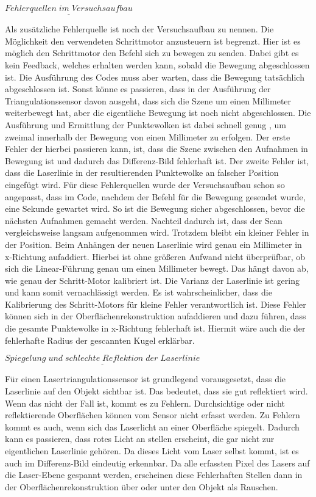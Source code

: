 		$\underline{Fehlerquellen \; im \; Versuchsaufbau}$
		
		Als zusätzliche Fehlerquelle ist noch der Versuchsaufbau zu nennen. Die Möglichkeit den verwendeten Schrittmotor anzusteuern ist begrenzt. Hier ist es möglich den Schrittmotor den Befehl sich zu bewegen zu senden. Dabei gibt es kein Feedback, welches erhalten werden kann, sobald die Bewegung abgeschlossen ist. Die Ausführung des Codes muss aber warten, dass die Bewegung tatsächlich abgeschlossen ist. Sonst könne es passieren, dass in der Ausführung der Triangulationssensor davon ausgeht, dass sich die Szene um einen Millimeter weiterbewegt hat, aber die eigentliche Bewegung ist noch nicht abgeschlossen. Die Ausführung und Ermittlung der Punktewolken ist dabei schnell genug , um zweimal innerhalb der Bewegung von einen Millimeter zu erfolgen. Der erste Fehler der hierbei passieren kann, ist, dass die Szene zwischen den Aufnahmen in Bewegung ist und dadurch das Differenz-Bild fehlerhaft ist. Der zweite Fehler ist, dass die Laserlinie in der resultierenden Punktewolke an falscher Position eingefügt wird. Für diese Fehlerquellen wurde der Versuchsaufbau schon so angepasst, dass im Code, nachdem der Befehl für die Bewegung gesendet wurde, eine Sekunde gewartet wird. So ist die Bewegung sicher abgeschlossen, bevor die nächsten Aufnahmen gemacht werden. Nachteil dadurch ist, dass der Scan vergleichsweise langsam aufgenommen wird. Trotzdem bleibt ein kleiner Fehler in der Position. Beim Anhängen der neuen Laserlinie wird genau ein Millimeter in x-Richtung aufaddiert. Hierbei ist ohne größeren Aufwand nicht überprüfbar, ob sich die Linear-Führung genau um einen Millimeter bewegt. Das hängt davon ab, wie genau der Schritt-Motor kalibriert ist. Die Varianz der Laserlinie ist gering und kann somit vernachlässigt werden. Es ist wahrscheinlicher, dass die Kalibrierung des Schritt-Motors für kleine Fehler verantwortlich ist. Diese Fehler können sich in der Oberflächenrekonstruktion aufaddieren und dazu führen, dass die gesamte Punktewolke in x-Richtung fehlerhaft ist. Hiermit wäre auch die der fehlerhafte Radius der gescannten Kugel erklärbar.
		
		$\underline{Spiegelung \; und \; schlechte \; Reflektion \; der \; Laserlinie}$
		
		Für einen Lasertriangulationssensor ist grundlegend vorausgesetzt, dass die Laserlinie auf den Objekt sichtbar ist. Das bedeutet, dass sie gut reflektiert wird. Wenn das nicht der Fall ist, kommt es zu Fehlern. Durchsichtige oder nicht reflektierende Oberflächen können vom Sensor nicht erfasst werden. Zu Fehlern kommt es auch, wenn sich das Laserlicht an einer Oberfläche spiegelt. Dadurch kann es passieren, dass rotes Licht an stellen erscheint, die gar nicht zur eigentlichen Laserlinie gehören. Da dieses Licht vom Laser selbst kommt, ist es auch im Differenz-Bild eindeutig erkennbar. Da alle erfassten Pixel des Lasers auf die Laser-Ebene gespannt werden, erscheinen diese Fehlerhaften Stellen dann in der Oberflächenrekonstruktion über oder unter den Objekt als Rauschen. 